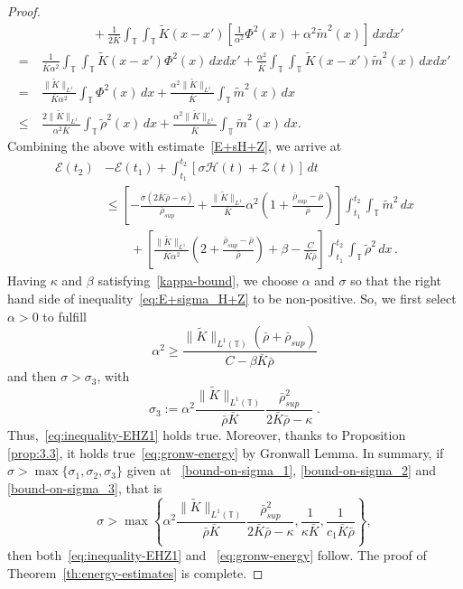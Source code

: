 \documentclass[10pt,a4paper]{amsart}
\newcommand{\bbt} {\mathbb T}
\begin{document}
\begin{proof}
\begin{align*}
    &\qquad \qquad + \frac{1}{2\bar K}\int_\bbt\int_\bbt \tilde K(x-x')[\frac{1}{\alpha^2}\Phi^2(x)+\alpha^2\tilde m^2(x)]\,dxdx'\\
   =~ &\frac{1}{\bar K\alpha^2}\int_\bbt\int_\bbt \tilde K(x-x')\Phi^2(x)\,dxdx' + \frac{\alpha^2}{\bar K}\int_\bbt\int_\bbt \tilde K(x-x') \tilde m^2(x)\,dxdx'\\
    =  ~&  \frac{\| \tilde K\|_{L^1}}{\bar K\alpha^2}\int_\bbt\Phi^2(x)\,dx + \frac{\alpha^2\| \tilde K\|_{L^1}}{\bar K}\int_\bbt  \tilde m^2(x)\,dx\\
  \leq ~&  \frac{2\| \tilde K\|_{L^1}}{\alpha^2\bar K}\int_\bbt\tilde\rho^2(x)\,dx + \frac{\alpha^2\| \tilde K\|_{L^1}}{\bar K}\int_\bbt  \tilde m^2(x)\,dx.
\end{align*}
Combining the above with estimate~\eqref{E+sH+Z}, we arrive at
\begin{align}
    \mathcal{E}(t_2)  &-\mathcal{E}(t_1)  + \int_{t_1}^{t_2}\left[\sigma \mathcal{H}(t) + \mathcal{Z}(t)\right]\,dt \nonumber\\
    & \leq \left[- \frac{\sigma(2\bar K\bar\rho-\kappa)}{\bar\rho_{sup}}+\frac{\|\tilde K\|_{L^1}}{\bar K}\alpha^2\left(  1+\frac{\bar\rho_{sup}-\bar\rho}{\bar\rho}\right)\right]\int_{t_1}^{t_2}\int_\bbt \tilde m^2\,dx \nonumber\\
    & \qquad + \left[\frac{\|\tilde K\|_{L^1}}{\bar K\alpha^2}\left( 2+\frac{\bar\rho_{sup}-\bar\rho}{\bar\rho} \right) + \beta - \frac{C}{\bar K\bar\rho}\right]\int_{t_1}^{t_2}\int_\bbt\tilde\rho^2\,dx\,. \label{eq:E+sigma_H+Z}
\end{align}
Having $\kappa$ and $\beta$ satisfying~\eqref{kappa-bound}, we choose $\alpha$ and $\sigma$ 
so that the right hand side of inequality~\eqref{eq:E+sigma_H+Z} to be non-positive. 
So, we first select $\alpha>0$ to fulfill
\begin{equation}\label{cond-on-alpha}
\alpha^2\geq \frac{\| \tilde K \|_{L^1(\bbt)}(\bar\rho+\bar\rho_{sup})}{C-\beta\bar K\bar\rho}
\end{equation}
and then $\sigma>\sigma_3$, with
\begin{equation}\label{bound-on-sigma_3}
\sigma_3:=\alpha^2 \frac{\| \tilde K \|_{L^1(\bbt)}}{\bar\rho\bar K}\frac{\bar\rho_{sup}^2}{2\bar K\bar\rho-\kappa}\;.
\end{equation}
Thus,~\eqref{eq:inequality-EHZ1} holds true. Moreover, thanks to Proposition \ref{prop:3.3}, it holds true~\eqref{eq:gronw-energy} by Gronwall Lemma. 
In summary, if $\sigma>\max\{\sigma_1,\sigma_2,\sigma_3\}$ given at ~\eqref{bound-on-sigma_1}, \eqref{bound-on-sigma_2} and \eqref{bound-on-sigma_3}, that is
\begin{equation}
\sigma  > \max\left\{ \alpha^2 \frac{\| \tilde K \|_{L^1(\bbt)}}{\bar\rho\bar K}\frac{\bar\rho_{sup}^2}{2\bar K\bar\rho-\kappa}, \frac 1 {\kappa \bar K}, \frac{1}{c_1\bar K\bar\rho}\right\},\label{eq:constants}    
\end{equation}
then both~\eqref{eq:inequality-EHZ1} and ~\eqref{eq:gronw-energy} follow. The proof of Theorem~\ref{th:energy-estimates} is complete.
\end{proof}
\end{document}
